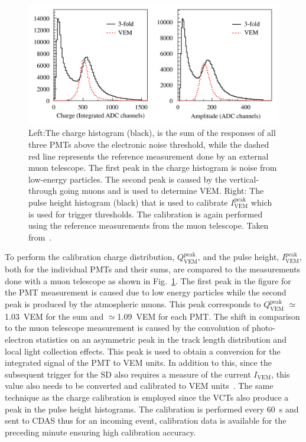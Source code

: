 \begin{figure}[h!]
  \centering
  \includegraphics[width=\textwidth]{thesis_figures/Setup/VEM_Calib_SD.png}
  \caption{Left:The charge histogram (black), is the sum of the responses of all three
  PMTs above the electronic noise threshold, while the dashed red line
  represents the reference measurement done by an external muon telescope.
  The first peak in the charge histogram is noise from low-energy particles. The second peak is caused by the vertical-through going muons and is used to determine VEM. Right: The pulse height histogram (black) that is
  used to calibrate $I^{\text{peak}}_{\text{VEM}}$ which is used for trigger thresholds. The calibration is again performed using the reference measurements from the muon telescope. Taken from~\cite{PierreAuger:2005znw}.}
  \label{fig:SD_VEM_calib}
\end{figure}

To perform the calibration charge distribution, $Q_{\text{VEM}}^{\text{peak}}$, and the pulse height, $I_{\text{VEM}}^{\text{peak}}$, both for the individual PMTs and their sums, are compared to the measurements done with a muon telescope as shown in Fig.~\ref{fig:SD_VEM_calib}. The first peak in the figure for the PMT measurement is caused due to low energy particles while the second peak is produced by the atmospheric muons. This peak corresponds to $Q_{\text{VEM}}^{\text{peak}}$ $\simeq$ 1.03 VEM for the sum and $\simeq$1.09 VEM for each PMT. The shift in comparison to the muon telescope measurement is caused by the convolution of photo-electron statistics on an asymmetric peak in the track length distribution and local light collection effects. This peak is used to obtain a conversion for the integrated signal of the PMT to VEM units. In addition to this, since the subsequent trigger for the SD also requires a measure of the current $I_{\text{VEM}}$, this value also needs to be converted and calibrated to VEM units~\cite{PierreAuger:2005znw}. The same technique as the charge calibration is employed since the VCTs also produce a peak in the pulse height histograms. The calibration is performed every 60 s and sent to CDAS thus for an incoming event, calibration data is available for the preceding minute ensuring high calibration accuracy. 

